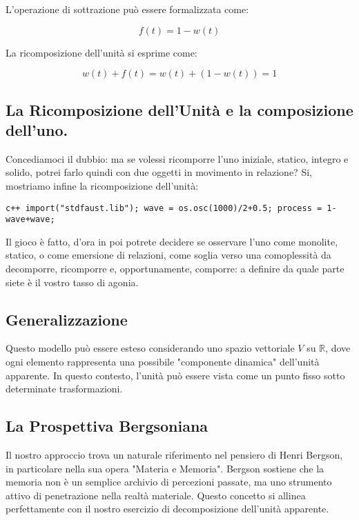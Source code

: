 \documentclass[a4paper,11pt]{article}
\begin{document}
L'operazione di sottrazione può essere formalizzata come:

\begin{displaymath}
f(t) = 1 - w(t)
\end{displaymath}

La ricomposizione dell'unità si esprime come:

\begin{displaymath}
w(t) + f(t) = w(t) + (1 - w(t)) = 1
\end{displaymath}

\subsection{La Ricomposizione dell'Unità e la composizione dell'uno.}\hypertarget{la-ricomposizione-dellunit-e-la-composizione-delluno}{}\label{la-ricomposizione-dellunit-e-la-composizione-delluno}

Concediamoci il dubbio: ma se volessi ricomporre l'uno iniziale, statico,
integro e solido, potrei farlo quindi con due oggetti in movimento in
relazione? Si, mostriamo infine la ricomposizione dell'unità:

\texttt{c++
import("stdfaust.lib");
wave = os.osc(1000)/2+0.5;
process = 1-wave+wave;
}

Il gioco è fatto, d'ora in poi potrete decidere se osservare l'uno come
monolite, statico, o come emersione di relazioni, come soglia verso
una comoplessità da decomporre, ricomporre e, opportunamente, comporre:
a definire da quale parte siete è il vostro tasso di agonia.

\subsection{Generalizzazione}\hypertarget{generalizzazione}{}\label{generalizzazione}

Questo modello può essere esteso considerando uno spazio vettoriale $V$
su $\mathbb{R}$, dove ogni elemento rappresenta una possibile
"componente dinamica" dell'unità apparente. In questo contesto,
l'unità può essere vista come un punto fisso sotto determinate
trasformazioni.

\subsection{La Prospettiva Bergsoniana}\hypertarget{la-prospettiva-bergsoniana}{}\label{la-prospettiva-bergsoniana}

Il nostro approccio trova un naturale riferimento nel pensiero di Henri
Bergson, in particolare nella sua opera "Materia e Memoria". Bergson
sostiene che la memoria non è un semplice archivio di percezioni
passate, ma uno strumento attivo di penetrazione nella realtà materiale.
Questo concetto si allinea perfettamente con il nostro esercizio di
decomposizione dell'unità apparente.
\end{document}
